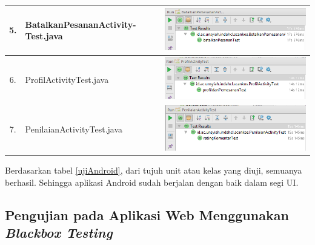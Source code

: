 \begin{longtable}{ |c|p{5cm}|p{7cm}| }
			 5. &BatalkanPesananActivity-Test.java& 
			 \begin{minipage}{7cm}
			 	\smallskip
			 	\includegraphics[scale=0.6]{gambar/testingAndroid/batalAct}
			 	\smallskip
			 \end{minipage}
			 \\ \hline
			 
			  6. &ProfilActivityTest.java& 
			 \begin{minipage}{7cm}
			 	\smallskip
			 	\includegraphics[scale=0.6]{gambar/testingAndroid/profilAct}
			 	\smallskip
			 \end{minipage}
			 \\ \hline
			 
			 7. &PenilaianActivityTest.java& 
			 \begin{minipage}{7cm}
			 	\smallskip
			 	\includegraphics[scale=0.6]{gambar/testingAndroid/penilaianAct}
			 	\smallskip
			 \end{minipage}
			 \\ \hline
			
		\end{longtable}
		
	Berdasarkan tabel \ref{ujiAndroid}, dari tujuh unit atau kelas yang diuji, semuanya berhasil. Sehingga aplikasi Android sudah berjalan dengan baik dalam segi UI.
	
	\subsection{Pengujian pada Aplikasi Web Menggunakan \textit{Blackbox Testing}}
	
